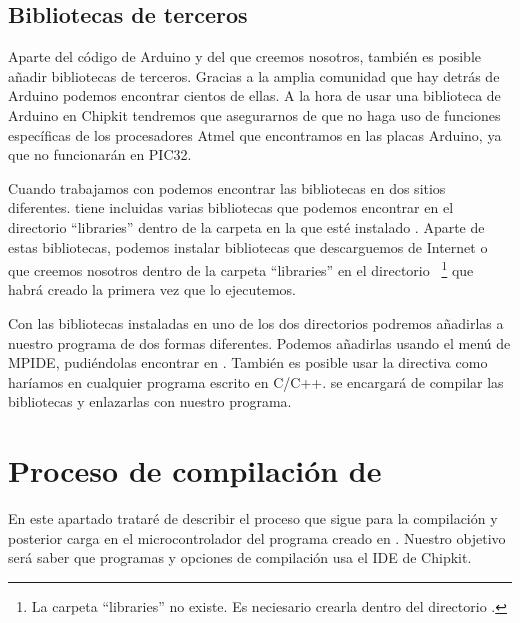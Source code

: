\subsection{Bibliotecas de terceros}
Aparte del código de Arduino y del que creemos nosotros, también es posible añadir bibliotecas de terceros. Gracias a la amplia comunidad que hay detrás de Arduino podemos encontrar cientos de ellas. A la hora de usar una biblioteca de Arduino en Chipkit tendremos que asegurarnos de que no haga uso de funciones específicas de los procesadores Atmel que encontramos en las placas Arduino, ya que no funcionarán en PIC32.

Cuando trabajamos con  podemos encontrar las bibliotecas en dos sitios diferentes.  tiene incluidas varias bibliotecas que podemos encontrar en el directorio ``libraries'' dentro de la carpeta en la que esté instalado . Aparte de estas bibliotecas, podemos instalar bibliotecas que descarguemos de Internet o que creemos nosotros dentro de la carpeta ``libraries'' en el directorio ~\protect\footnote{La carpeta ``libraries'' no existe. Es neciesario crearla dentro del directorio .} que  habrá creado la primera vez que lo ejecutemos.

Con las bibliotecas instaladas en uno de los dos directorios podremos añadirlas a nuestro programa de dos formas diferentes. Podemos añadirlas usando el menú de MPIDE, pudiéndolas encontrar en . También es posible usar la directiva  como haríamos en cualquier programa escrito en C/C++.  se encargará de compilar las bibliotecas y enlazarlas con nuestro programa.

\section{Proceso de compilación de }
En este apartado trataré de describir el proceso que sigue  para la compilación y posterior carga en el microcontrolador del programa creado en . Nuestro objetivo será saber que programas y opciones de compilación usa el IDE de Chipkit.

